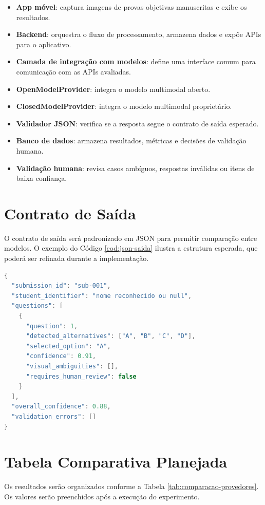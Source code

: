 \begin{itemize}
    \item \textbf{App móvel}: captura imagens de provas objetivas manuscritas e exibe os resultados.
    \item \textbf{Backend}: orquestra o fluxo de processamento, armazena dados e expõe APIs para o aplicativo.
    \item \textbf{Camada de integração com modelos}: define uma interface comum para comunicação com as APIs avaliadas.
    \item \textbf{OpenModelProvider}: integra o modelo multimodal aberto.
    \item \textbf{ClosedModelProvider}: integra o modelo multimodal proprietário.
    \item \textbf{Validador JSON}: verifica se a resposta segue o contrato de saída esperado.
    \item \textbf{Banco de dados}: armazena resultados, métricas e decisões de validação humana.
    \item \textbf{Validação humana}: revisa casos ambíguos, respostas inválidas ou itens de baixa confiança.
\end{itemize}

\section{Contrato de Saída}

O contrato de saída será padronizado em JSON para permitir comparação entre modelos. O exemplo do Código \ref{cod:json-saida} ilustra a estrutura esperada, que poderá ser refinada durante a implementação.

\begin{lstlisting}[caption={Exemplo de saída padronizada em JSON},label={cod:json-saida},language=Java]
{
  "submission_id": "sub-001",
  "student_identifier": "nome reconhecido ou null",
  "questions": [
    {
      "question": 1,
      "detected_alternatives": ["A", "B", "C", "D"],
      "selected_option": "A",
      "confidence": 0.91,
      "visual_ambiguities": [],
      "requires_human_review": false
    }
  ],
  "overall_confidence": 0.88,
  "validation_errors": []
}
\end{lstlisting}

\section{Tabela Comparativa Planejada}

Os resultados serão organizados conforme a Tabela \ref{tab:comparacao-provedores}. Os valores serão preenchidos após a execução do experimento.

